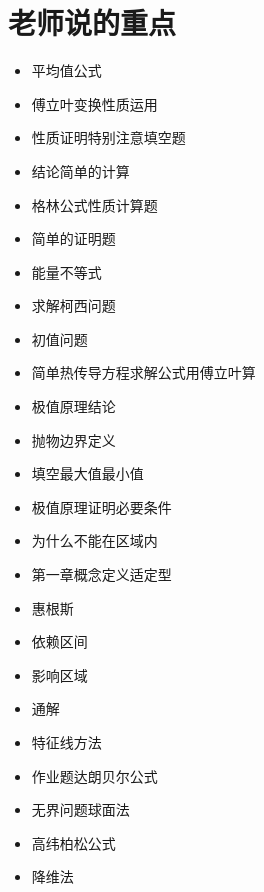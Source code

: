\section{老师说的重点}
\begin{itemize}
  \item 平均值公式
  \item 傅立叶变换性质运用
  \item 性质证明特别注意填空题
  \item 结论简单的计算
  \item 格林公式性质计算题
  \item 简单的证明题
  \item 能量不等式
\end{itemize}

\begin{itemize}
  \item 求解柯西问题
  \item 初值问题
  \item 简单热传导方程求解公式用傅立叶算
\end{itemize}

\begin{itemize}
  \item 极值原理结论
  \item 抛物边界定义
  \item 填空最大值最小值
  \item 极值原理证明必要条件
  \item 为什么不能在区域内
\end{itemize}

\begin{itemize}
  \item 第一章概念定义适定型
  \item 惠根斯
  \item 依赖区间
  \item 影响区域
  \item 通解
  \item 特征线方法
  \item 作业题达朗贝尔公式
  \item 无界问题球面法
  \item 高纬柏松公式
  \item 降维法
\end{itemize}

